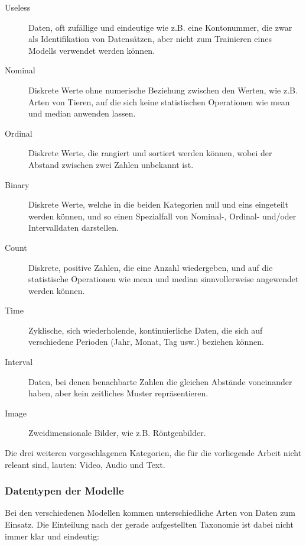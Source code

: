 \begin{description}
    \item[Useless] Daten, oft zufällige und eindeutige wie z.B. eine Kontonummer, die zwar als Identifikation von Datensätzen, aber nicht zum Trainieren eines Modells verwendet werden können.
    \item[Nominal] Diskrete Werte ohne numerische Beziehung zwischen den Werten, wie z.B. Arten von Tieren, auf die sich keine statistischen Operationen wie mean und median anwenden lassen.
    \item[Ordinal] Diskrete Werte, die rangiert und sortiert werden können, wobei der Abstand zwischen zwei Zahlen unbekannt ist.
    \item[Binary] Diskrete Werte, welche in die beiden Kategorien null und eins eingeteilt werden können, und so einen Spezialfall von Nominal-, Ordinal- und/oder Intervalldaten darstellen.
    \item[Count] Diskrete, positive Zahlen, die eine Anzahl wiedergeben, und auf die statistische Operationen wie mean und median sinnvollerweise angewendet werden können.
    \item[Time] Zyklische, sich wiederholende, kontinuierliche Daten, die sich auf verschiedene Perioden (Jahr, Monat, Tag usw.) beziehen können.
    \item[Interval] Daten, bei denen benachbarte Zahlen die gleichen Abstände voneinander haben, aber kein zeitliches Muster repräsentieren.
    \item[Image] Zweidimensionale Bilder, wie z.B. Röntgenbilder.
\end{description}

Die drei weiteren vorgeschlagenen Kategorien, die für die vorliegende Arbeit nicht releant sind, lauten: Video, Audio und Text.

\subsubsection{Datentypen der Modelle}

Bei den verschiedenen Modellen kommen unterschiedliche Arten von Daten zum Einsatz. Die Einteilung nach der gerade aufgestellten Taxonomie ist dabei nicht immer klar und eindeutig:

